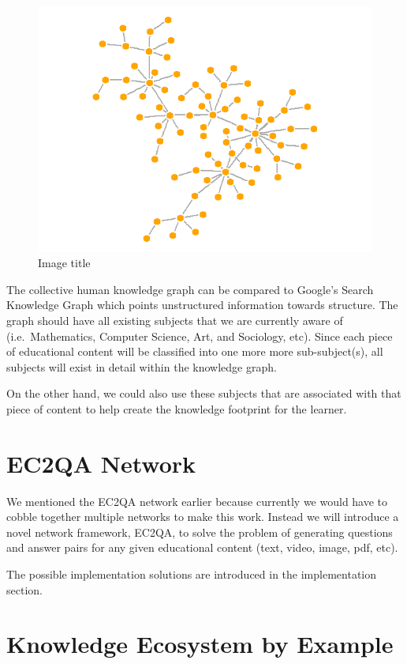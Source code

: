 \documentclass[]{book}
\theoremstyle{definition}
\theoremstyle{definition}
\theoremstyle{definition}
\theoremstyle{remark}
\begin{document}
\begin{figure}
\centering
\includegraphics{img/knowledge_graphy.png}
\caption{Image title}
\end{figure}

The collective human knowledge graph can be compared to Google's Search
Knowledge Graph \citep{googlekg} which points unstructured information
towards structure. The graph should have all existing subjects that we
are currently aware of (i.e.~Mathematics, Computer Science, Art, and
Sociology, etc). Since each piece of educational content will be
classified into one more more sub-subject(s), all subjects will exist in
detail within the knowledge graph.

On the other hand, we could also use these subjects that are associated
with that piece of content to help create the knowledge footprint for
the learner.

\section{EC2QA Network}\label{ec2qa-network}

We mentioned the EC2QA network earlier because currently we would have
to cobble together multiple networks to make this work. Instead we will
introduce a novel network framework, EC2QA, to solve the problem of
generating questions and answer pairs for any given educational content
(text, video, image, pdf, etc).

The possible implementation solutions are introduced in the
implementation section.

\section{Knowledge Ecosystem by
Example}\label{knowledge-ecosystem-by-example}
\end{document}
